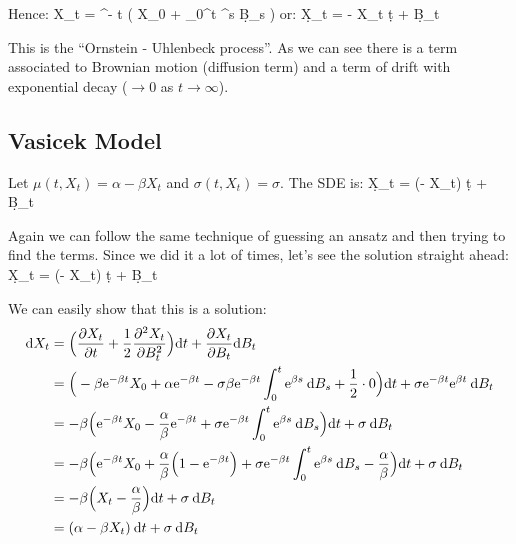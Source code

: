 Hence:
\bse
X_{t} = \e^{- \alpha t} \Big( X_{0} + \int_{0}^{t} \sigma \e^{\alpha s} \: \d B_{s} \Big)
\ese
or:
\bse
{}
\qquad {} \qquad
\d X_{t} = - \alpha X_{t} \: \d t + \sigma \: \d B_{t}
\ese

This is the ``Ornstein - Uhlenbeck process''. As we can see there is a term associated to Brownian motion
(diffusion term) and a term of drift with exponential decay ($\to 0$ as $t \to \infty$).

\subsection{Vasicek Model}

Let $\mu(t, X_{t}) = \alpha - \beta X_{t}$ and $\sigma(t, X_{t}) = \sigma$. The SDE is:
\bse
\d X_{t} = (\alpha - \beta X_{t}) \: \d t + \sigma \: \d B_{t}
\ese

Again we can follow the same technique of guessing an ansatz and then trying to find the terms. Since we did it a
lot of times, let's see the solution straight ahead:
\bse
{}
\qquad {} \qquad
\d X_{t} = (\alpha - \beta X_{t}) \: \d t + \sigma \: \d B_{t}
\ese

We can easily show that this is a solution:
\begin{align*}
\mathrm{d} X_{t} &= \Big( \frac{\partial X_{t}}{\partial t} + \frac{1}{2} \frac{\partial^{2} X_{t}}{\partial B_{t}^{2}} \Big) \mathrm{d} t +
\frac{\partial X_{t}}{\partial B_{t}} \mathrm{d} B_{t} \\
&= \Big( - \beta \mathrm{e}^{- \beta t} X_{0} + \alpha \mathrm{e}^{- \beta t} - \sigma \beta \mathrm{e}^{- \beta t} \int_{0}^{t}
\mathrm{e}^{\beta s} \: \mathrm{d} B_{s} + \frac{1}{2} \cdot 0 \Big) \mathrm{d} t + \sigma \mathrm{e}^{- \beta t} \mathrm{e}^{\beta t} \: \mathrm{d} B_{t} \\
&= - \beta \Big( \mathrm{e}^{- \beta t} X_{0} - \frac{\alpha}{\beta} \mathrm{e}^{- \beta t} + \sigma \mathrm{e}^{- \beta t} \int_{0}^{t}
\mathrm{e}^{\beta s} \: \mathrm{d} B_{s} \Big) \mathrm{d} t + \sigma \: \mathrm{d} B_{t} \\
&= - \beta \Big( \mathrm{e}^{- \beta t} X_{0} + \frac{\alpha}{\beta} \Big( 1 - \mathrm{e}^{- \beta t} \Big) + \sigma \mathrm{e}^{- \beta t}
\int_{0}^{t} \mathrm{e}^{\beta s} \: \mathrm{d} B_{s} - \frac{\alpha}{\beta} \Big) \mathrm{d} t + \sigma \: \mathrm{d} B_{t} \\
&= - \beta \Big( X_{t} - \frac{\alpha}{\beta} \Big) \mathrm{d} t + \sigma \: \mathrm{d} B_{t} \\
&= (\alpha - \beta X_{t}) \: \mathrm{d} t + \sigma \: \mathrm{d} B_{t}
\end{align*}

